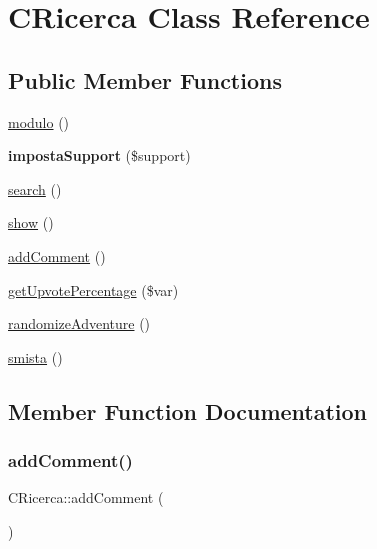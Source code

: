 \hypertarget{class_c_ricerca}{}\section{C\+Ricerca Class Reference}
\label{class_c_ricerca}
\subsection*{Public Member Functions}
\begin{DoxyCompactItemize}
\item 
\mbox{\hyperlink{class_c_ricerca_a149757b6826a18b0b3da3045cbeadd4c}{modulo}} ()
\item 
\mbox{\label{class_c_ricerca_a08fab74f09629da7944d8fb462db99f2}} 
{\bfseries imposta\+Support} (\$support)
\item 
\mbox{\hyperlink{class_c_ricerca_ad9db48dfeb34933bf9d12c911d2b34a4}{search}} ()
\item 
\mbox{\hyperlink{class_c_ricerca_a86b16017d05539bb20445d2bcff3b16a}{show}} ()
\item 
\mbox{\hyperlink{class_c_ricerca_aedf6627cd6b696972d0e957c752918b0}{add\+Comment}} ()
\item 
\mbox{\hyperlink{class_c_ricerca_a1792ba41fe84b680ca7cee896402a83a}{get\+Upvote\+Percentage}} (\$var)
\item 
\mbox{\hyperlink{class_c_ricerca_a33fcd2d514cb41fbffcdc8bdd97c6176}{randomize\+Adventure}} ()
\item 
\mbox{\hyperlink{class_c_ricerca_ac96d19e55d037f65635a90579c76c84c}{smista}} ()
\end{DoxyCompactItemize}


\subsection{Member Function Documentation}
\mbox{\label{class_c_ricerca_aedf6627cd6b696972d0e957c752918b0}} 
\subsubsection{\texorpdfstring{add\+Comment()}{addComment()}}
{\footnotesize\ttfamily C\+Ricerca\+::add\+Comment (\begin{DoxyParamCaption}{ }\end{DoxyParamCaption})}

